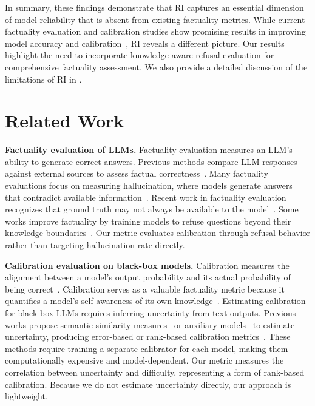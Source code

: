 \documentclass{article} %
\theoremstyle{definition}
\begin{document}
In summary, these findings demonstrate that RI captures an essential dimension of model reliability that is absent from existing factuality metrics. 
While current factuality evaluation and calibration studies show promising results in improving model accuracy and calibration~\citep{kadavathLanguageModelsMostly2022}, RI reveals a different picture. 
Our results highlight the need to incorporate knowledge-aware refusal evaluation for comprehensive factuality assessment.  
We also provide a detailed discussion of the limitations of RI in .

\vspace{-0.7em}
\section{Related Work}
\vspace{-0.7em}
\label{sec:related_works}

\noindent\textbf{Factuality evaluation of LLMs.}
Factuality evaluation measures an LLM's ability to generate correct answers.
Previous methods compare LLM responses against external sources to assess factual correctness~\citep{wei2024measuringshortformfactualitylarge, min-etal-2023-factscore, kwiatkowski-etal-2019-natural}.
Many factuality evaluations focus on measuring hallucination, where models generate answers that contradict available information~\citep{bangHalluLensLLMHallucination2025}. Recent work in factuality evaluation recognizes that ground truth may not always be available to the model~\citep{jing2025factuality}.
Some works improve factuality by training models to refuse questions beyond their knowledge boundaries~\citep{cao2024learn, xu2024reliability, ouyang-etal-2022-training}.
Our metric evaluates calibration through refusal behavior rather than targeting hallucination rate directly.

\noindent\textbf{Calibration evaluation on black-box models.}
Calibration measures the alignment between a model's output probability and its actual probability of being correct~\citep{guo2017calibration}. Calibration serves as a valuable factuality metric because it quantifies a model's self-awareness of its own knowledge~\citep{kadavath2022mostly, yin-etal-2023-selfaware, agrawal2023hallucinating}. 
Estimating calibration for black-box LLMs requires inferring uncertainty from text outputs. Previous works propose semantic similarity measures~\citep{kuhn-etal-2023-semantic, farquhar-etal-2024-semantic} or auxiliary models~\citep{ulmer-etal-2024-calibrating} to estimate uncertainty, producing error-based or rank-based calibration metrics~\citep{huang-etal-2024-rank}. These methods require training a separate calibrator for each model, making them computationally expensive and model-dependent.
Our metric measures the correlation between uncertainty and difficulty, representing a form of rank-based calibration. Because we do not estimate uncertainty directly, our approach is lightweight.
\end{document}
